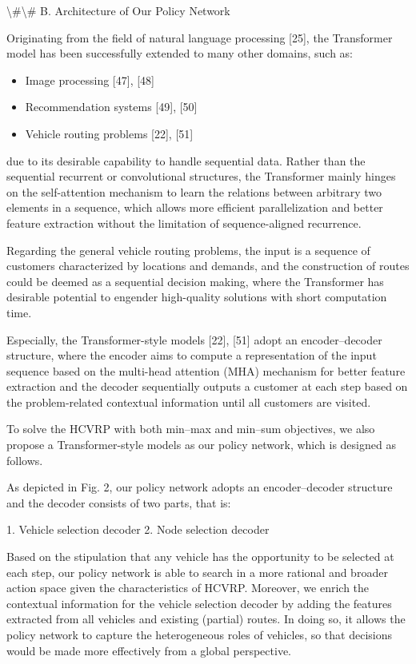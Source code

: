 \documentclass{article}
\begin{document}
	\textbackslash{}#\textbackslash{}# B. Architecture of Our Policy Network
	
	Originating from the field of natural language processing [25], the Transformer model has been successfully extended to many other domains, such as:
	
	\begin{itemize}
		\item Image processing [47], [48]
		\item Recommendation systems [49], [50]
		\item Vehicle routing problems [22], [51]
	\end{itemize}
	
	due to its desirable capability to handle sequential data. Rather than the sequential recurrent or convolutional structures, the Transformer mainly hinges on the self-attention mechanism to learn the relations between arbitrary two elements in a sequence, which allows more efficient parallelization and better feature extraction without the limitation of sequence-aligned recurrence.
	
	Regarding the general vehicle routing problems, the input is a sequence of customers characterized by locations and demands, and the construction of routes could be deemed as a sequential decision making, where the Transformer has desirable potential to engender high-quality solutions with short computation time.
	
	Especially, the Transformer-style models [22], [51] adopt an encoder–decoder structure, where the encoder aims to compute a representation of the input sequence based on the multi-head attention (MHA) mechanism for better feature extraction and the decoder sequentially outputs a customer at each step based on the problem-related contextual information until all customers are visited.
	
	To solve the HCVRP with both min–max and min–sum objectives, we also propose a Transformer-style models as our policy network, which is designed as follows.
	
	As depicted in Fig. 2, our policy network adopts an encoder–decoder structure and the decoder consists of two parts, that is:
	
	1. Vehicle selection decoder
	2. Node selection decoder
	
	Based on the stipulation that any vehicle has the opportunity to be selected at each step, our policy network is able to search in a more rational and broader action space given the characteristics of HCVRP. Moreover, we enrich the contextual information for the vehicle selection decoder by adding the features extracted from all vehicles and existing (partial) routes. In doing so, it allows the policy network to capture the heterogeneous roles of vehicles, so that decisions would be made more effectively from a global perspective.
	
\end{document}
